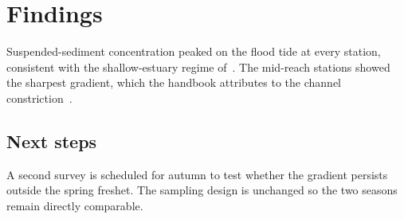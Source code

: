\section{Findings}

Suspended-sediment concentration peaked on the flood tide at every
station, consistent with the shallow-estuary regime
of~\cite{rivers2023}. The mid-reach stations showed the sharpest
gradient, which the handbook attributes to the channel
constriction~\cite{handbook2021}.

\subsection{Next steps}

A second survey is scheduled for autumn to test whether the gradient
persists outside the spring freshet. The sampling design is unchanged
so the two seasons remain directly comparable.
